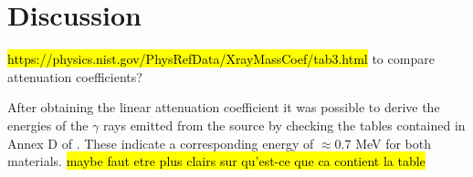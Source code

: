 \section{Discussion}

\hl{https://physics.nist.gov/PhysRefData/XrayMassCoef/tab3.html} to compare attenuation coefficients?

After obtaining the linear attenuation coefficient it was possible to derive the energies of the $\gamma$ rays emitted from the source by checking the tables contained in Annex D of \cite{notice_generale}.
These indicate a corresponding energy of $\approx 0.7$ MeV for both materials.
\hl{maybe faut etre plus clairs sur qu'est-ce que ca contient la table}
